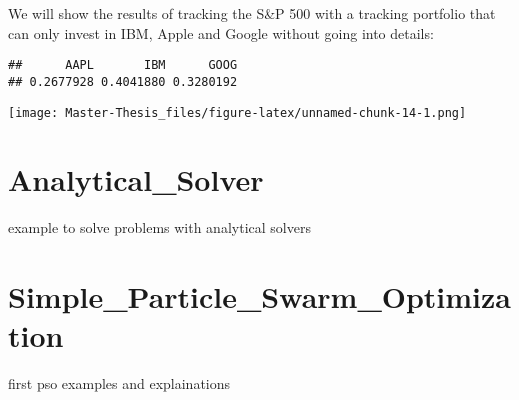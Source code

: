 \documentclass[
  oneside]{book}
\begin{document}
We will show the results of tracking the S\&P 500 with a tracking portfolio that can only invest in IBM, Apple and Google without going into details:

\begin{verbatim}
##      AAPL       IBM      GOOG 
## 0.2677928 0.4041880 0.3280192
\end{verbatim}

\texttt{[image: Master-Thesis\_files/figure-latex/unnamed-chunk-14-1.png]}

\hypertarget{analytical_solver}{%
\chapter{Analytical\_Solver}\label{analytical_solver}}

example to solve problems with analytical solvers

\hypertarget{simple_particle_swarm_optimization}{%
\chapter{Simple\_Particle\_Swarm\_Optimization}\label{simple_particle_swarm_optimization}}

first pso examples and explainations

  
\end{document}
